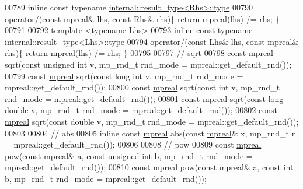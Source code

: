 \begin{DoxyCode}
00789 \textcolor{keyword}{inline} \textcolor{keyword}{const} \textcolor{keyword}{typename} \hyperlink{structmpfr_1_1internal_1_1result__type}{internal::result\_type<Rhs>::type}
00790     operator/(\textcolor{keyword}{const} \hyperlink{classmpfr_1_1mpreal}{mpreal}& lhs, \textcolor{keyword}{const} Rhs& rhs)\{ \textcolor{keywordflow}{return} \hyperlink{classmpfr_1_1mpreal}{mpreal}(lhs) /= rhs;    \}
00791 
00792 \textcolor{keyword}{template} <\textcolor{keyword}{typename} Lhs>
00793 \textcolor{keyword}{inline} \textcolor{keyword}{const} \textcolor{keyword}{typename} \hyperlink{structmpfr_1_1internal_1_1result__type}{internal::result\_type<Lhs>::type}
00794     operator/(\textcolor{keyword}{const} Lhs& lhs, \textcolor{keyword}{const} \hyperlink{classmpfr_1_1mpreal}{mpreal}& rhs)\{ \textcolor{keywordflow}{return} \hyperlink{classmpfr_1_1mpreal}{mpreal}(lhs) /= rhs;    \}
00795 
00797 \textcolor{comment}{// sqrt}
00798 \textcolor{keyword}{const} \hyperlink{classmpfr_1_1mpreal}{mpreal} sqrt(\textcolor{keyword}{const} \textcolor{keywordtype}{unsigned} \textcolor{keywordtype}{int} v, mp\_rnd\_t rnd\_mode = mpreal::get\_default\_rnd());
00799 \textcolor{keyword}{const} \hyperlink{classmpfr_1_1mpreal}{mpreal} sqrt(\textcolor{keyword}{const} \textcolor{keywordtype}{long} \textcolor{keywordtype}{int} v, mp\_rnd\_t rnd\_mode = mpreal::get\_default\_rnd());
00800 \textcolor{keyword}{const} \hyperlink{classmpfr_1_1mpreal}{mpreal} sqrt(\textcolor{keyword}{const} \textcolor{keywordtype}{int} v, mp\_rnd\_t rnd\_mode = mpreal::get\_default\_rnd());
00801 \textcolor{keyword}{const} \hyperlink{classmpfr_1_1mpreal}{mpreal} sqrt(\textcolor{keyword}{const} \textcolor{keywordtype}{long} \textcolor{keywordtype}{double} v, mp\_rnd\_t rnd\_mode = mpreal::get\_default\_rnd());
00802 \textcolor{keyword}{const} \hyperlink{classmpfr_1_1mpreal}{mpreal} sqrt(\textcolor{keyword}{const} \textcolor{keywordtype}{double} v, mp\_rnd\_t rnd\_mode = mpreal::get\_default\_rnd());
00803 
00804 \textcolor{comment}{// abs}
00805 \textcolor{keyword}{inline} \textcolor{keyword}{const} \hyperlink{classmpfr_1_1mpreal}{mpreal} abs(\textcolor{keyword}{const} \hyperlink{classmpfr_1_1mpreal}{mpreal}& x, mp\_rnd\_t r = mpreal::get\_default\_rnd());
00806 
00808 \textcolor{comment}{// pow}
00809 \textcolor{keyword}{const} \hyperlink{classmpfr_1_1mpreal}{mpreal} pow(\textcolor{keyword}{const} \hyperlink{classmpfr_1_1mpreal}{mpreal}& a, \textcolor{keyword}{const} \textcolor{keywordtype}{unsigned} \textcolor{keywordtype}{int} b, mp\_rnd\_t rnd\_mode = 
      mpreal::get\_default\_rnd());
00810 \textcolor{keyword}{const} \hyperlink{classmpfr_1_1mpreal}{mpreal} pow(\textcolor{keyword}{const} \hyperlink{classmpfr_1_1mpreal}{mpreal}& a, \textcolor{keyword}{const} \textcolor{keywordtype}{int} b, mp\_rnd\_t rnd\_mode = mpreal::get\_default\_rnd());

\end{DoxyCode}
